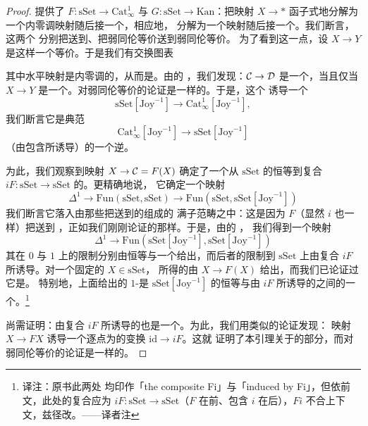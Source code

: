 \begin{proof}
\trSmallObjectArgument{}提供了\trFunctor{}%
$F\colon \mathrm{sSet} \to \mathrm{Cat}^1_{\infty}$ 与
$G\colon \mathrm{sSet} \to \mathrm{Kan}$：把映射
$X \to \ast$ 函子式地分解为一个内零调映射随后接一个\trInnerFibration{}，相应地，
分解为一个\trAnodyne{}映射随后接一个\trKanFibration{}。我们断言，这两个\trFunctor{}%
分别把\trJoyalEquivalence{}送到\trJoyalEquivalence{}、把弱同伦等价送到弱同伦等价。
为了看到这一点，设 $X \to Y$ 是这样一个等价。于是我们有交换图表
\begin{center}
\end{center}
其中水平映射是内零调的，从而是\trJoyalEquivalence{}。由\trJoyalEquivalence{}的%
\trThreeForTwoProperty{}，我们发现：$\mathcal{C} \to \mathcal{D}$ 是一个\trJoyalEquivalence{}，当且仅当
$X \to Y$ 是一个\trJoyalEquivalence{}。对弱同伦等价的论证是一样的。于是，这个%
\trFunctor{}诱导一个\trFunctor{}%
\[
\mathrm{sSet}[\mathrm{Joy}^{-1}] \longrightarrow
\mathrm{Cat}^1_{\infty}[\mathrm{Joy}^{-1}],
\]
我们断言它是典范\trFunctor{}%
\[
\mathrm{Cat}^1_{\infty}[\mathrm{Joy}^{-1}] \longrightarrow
\mathrm{sSet}[\mathrm{Joy}^{-1}]
\]
（由包含所诱导）的一个逆。

为此，我们观察到映射 $X \to \mathcal{C} = F(X)$ 确定了一个从 $\mathrm{sSet}$ 的恒等到复合
$iF\colon \mathrm{sSet} \to \mathrm{sSet}$ 的\trNaturalTransformation{}。更精确地说，
它确定一个映射
\[
\Delta^1 \longrightarrow \mathrm{Fun}(\mathrm{sSet}, \mathrm{sSet})
\longrightarrow \mathrm{Fun}(\mathrm{sSet}, \mathrm{sSet}[\mathrm{Joy}^{-1}])
\]
我们断言它落入由那些把\trJoyalEquivalence{}送到\trEquivalence{}的\trFunctor{}组成的
满子范畴之中：这是因为 $F$（显然 $i$ 也一样）把\trJoyalEquivalence{}送到%
\trJoyalEquivalence{}，正如我们刚刚论证的那样。于是，由\trLocalization{}的%
\trUniversalProperty{}，
我们得到一个映射
\[
\Delta^1 \longrightarrow
\mathrm{Fun}(\mathrm{sSet}[\mathrm{Joy}^{-1}], \mathrm{sSet}[\mathrm{Joy}^{-1}])
\]
其在 $0$ 与 $1$ 上的限制分别由恒等与一个\trFunctor{}给出，而后者的限制到
$\mathrm{sSet}$ 上由复合 $iF$ 所诱导。对一个固定的\trObject{} $X \in \mathrm{sSet}$，
所得的\trMorphism{}由 $X \to F(X)$ 给出，而我们已论证过它是\trJoyalEquivalence{}。
特别地，上面给出的 $1$-\trSimplex{}是 $\mathrm{sSet}[\mathrm{Joy}^{-1}]$ 的恒等与由
$iF$ 所诱导的\trFunctor{}之间的一个\trNaturalEquivalence{}。\footnote{译注：原书此两处
均印作「the composite Fi」与「induced by Fi」，但依前文，此处的复合应为
$iF\colon \mathrm{sSet} \to \mathrm{sSet}$（$F$ 在前、包含 $i$ 在后），$Fi$
不合上下文，兹径改。——译者注}

尚需证明：由复合 $iF$ 所诱导的\trFunctor{}也是一个\trEquivalence{}。为此，我们用类似的论证发现：
映射 $X \to FX$ 诱导一个逐点为\trJoyalEquivalence{}的变换 $\mathrm{id} \to iF$。这就
证明了本引理关于\trJoyalEquivalence{}的部分，而对弱同伦等价的论证是一样的。
\end{proof}


